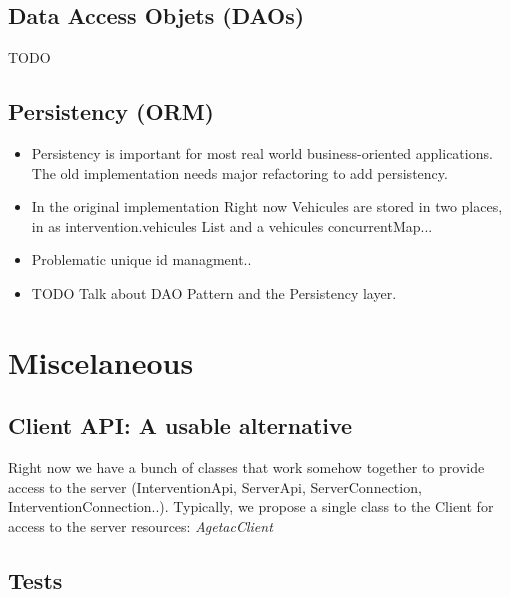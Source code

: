 \documentclass[12pt]{scrartcl}
\begin{document}
\subsection{Data Access Objets (DAOs)}

TODO

\subsection{Persistency (ORM)}

\begin{itemize}
\item Persistency is important for most real world business-oriented applications. The old implementation needs major refactoring to add persistency.

\item In the original implementation Right now Vehicules are stored in two places, in as intervention.vehicules List and a vehicules concurrentMap...

\item Problematic unique id managment..

\item TODO Talk about DAO Pattern and the Persistency layer.
\end{itemize}


\newpage

\section{Miscelaneous}

\subsection{Client API: A usable alternative}

Right now we have a bunch of classes that work somehow together to provide access to the server (InterventionApi, ServerApi, ServerConnection, InterventionConnection..). Typically, we propose a single class to the Client for access to the server resources: \emph{AgetacClient}

\subsection{Tests}
\end{document}
